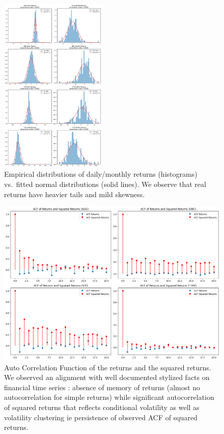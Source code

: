\documentclass[11pt]{article}
\begin{document}
\begin{figure}[!h]
    \centering
    \includegraphics[width=0.45\textwidth]{images/real_data_distribution.png}
    \caption{Empirical distributions of daily/monthly returns (histograms) vs.\ fitted normal distributions (solid lines). We observe that real returns have heavier tails and mild skewness.}
    \label{fig:realdata_distributions}
\end{figure}


\begin{figure}
    \centering
    \includegraphics[width=0.5\linewidth]{images/acf_real.png}
    \caption{Auto Correlation Function of the returns and the squared returns. We observed an alignment with well documented stylized facts  on financial time series : absence of memory of returns (almost no autocorrelation for simple returns) while significant autocorrelation of squared returns that reflects conditional volatility as well as volatility clustering ie persistence of observed ACF of squared returns.}
    \label{fig:enter-label}
\end{figure}

\clearpage
\end{document}
